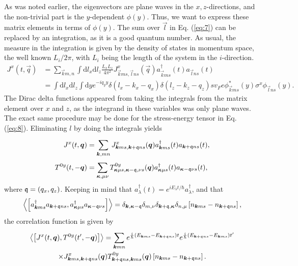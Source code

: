 As was noted earlier, the eigenvectors are plane waves in the $x, z$-directions, and the non-trivial part is the $y$-dependent $\phi (y)$.
Thus, we want to express these matrix elements in terms of $\phi (y)$.
The sum over $\vec{l}$ in Eq. (\ref{eq:7}) can be replaced by an integration, as it is a good quantum number.
As usual, the measure in the integration is given by the density of states in momentum space, the well known $L_{i} /2\pi $, with $L_i$ being the length of the system in the $i$-direction.
\begin{align}
  J^x(t, \vec{q}) &= \sum\limits_{\vec{k}m, n}^{} \int \mathrm{d}l_x \mathrm{d}l_z \frac{L_xL_z}{4 \pi ^2}
                    J^x_{\vec{k}ms, \vec{l}ns} (\vec{q}) a^{\dagger}_{\vec{k} ms} (t) a_{\vec{l} ns}(t)\\
  \nonumber &= \int \mathrm{d}l_x \mathrm{d} l_{z} \int \mathrm{d} y e^{-i q_y y}
                    \delta (l_x - k_x - q_x) \delta (l_z - k_z -  q_z)
                    sv_F e \phi ^{*}_{\vec{k} ms}(y) \sigma ^x \phi _{\vec{l}ns}(y).
\end{align}
The Dirac delta functions appeared from taking the integrals from the matrix element over $x$ and $z$, as the integrand in these variables was only plane waves.
The exact same procedure may be done for the stress-energy tensor in Eq. (\ref{eq:8}).
Eliminating $l$ by doing the integrals yields
\begin{align}
  J^x(t, \bm{q}) &= \sum\limits_{\bm{k}, mn}^{}
                    J^x_{\bm{k}ms, \bm{k}+\mathfrak{q} ns}(\bm{q}) a^{\dagger}_{\bm{k} ms}(t) a_{\bm{k}+\mathfrak{q} ns}(t),\\
  T^{0y}(t, -\bm{q}) &= \sum\limits_{\bm{\kappa}, \mu  \nu }^{} T^{0y}_{\bm{\kappa } \mu  s, \bm{\kappa } - \mathfrak{q}, \nu  s}(\bm{q}) a^{\dagger}_{\bm{\kappa } \mu   s}(t) a_{\bm{\kappa } - \mathfrak{q} \nu  s}(t),
\end{align}
where ${\mathfrak{q}} = (q_x, q_z)$.
Keeping in mind that $a_{\lambda }^{\dagger} (t) = e^{i E_{\lambda } t / \hbar }a_{\lambda }^{\dagger}$, and that
\begin{equation}
  \Braket{\left[
a^{\dagger}_{\bm{k}ms} a_{\bm{k}+\mathfrak{q} ns}, a^{\dagger}_{\bm{\kappa}\mu s} a_{\bm{\kappa}-\mathfrak{q} \nu  s}
\right]}
=
\delta_{\bm{k}, \bm{\kappa}-\mathfrak{q}}
\delta _{m, \nu }
\delta _{\bm{k}+\mathfrak{q}, \bm{\kappa}}
\delta _{n, \mu }
\left[ n_{\bm{k}ms}- n_{\bm{k}+\mathfrak{q} ns} \right],
\end{equation}
the correlation function is given by
\begin{multline}
  \Braket{\left[ J^x(t, \bm{q}), T^{0y}(t', -\bm{q}) \right]}
  =
  \sum\limits_{\bm{k} mn}^{}
  e^{\frac{i}{\hbar }( E_{\bm{k}ms} - E_{\bm{k}+\mathfrak{q} ns} )t}
  e^{\frac{i}{\hbar }( E_{\bm{k}+\mathfrak{q}ns} - E_{\bm{k}ms} ) t'}\\
  \times
  J^x_{\bm{k}ms, \bm{k}+\mathfrak{q}ns}(\bm{q})
  T^{0y}_{\bm{k}+\mathfrak{q}ns, \bm{k}ms}(\bm{q})
  \left[ n_{\bm{k}ms}- n_{\bm{k}+\mathfrak{q} ns} \right].
\end{multline}

